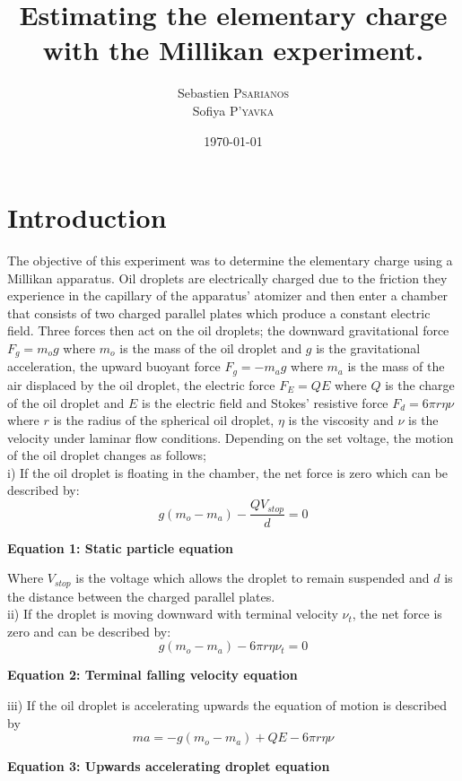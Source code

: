 \documentclass[
	letterpaper, %
	10pt, %
]{CSUniSchoolLabReport}
\title{Estimating the elementary charge with the Millikan experiment.}
\author{Sebastien \textsc{Psarianos}\\ Sofiya \textsc{P'yavka}}
\date{\today}
\begin{document}
\maketitle

\section{Introduction}
The objective of this experiment was to determine the elementary charge using a Millikan apparatus.
Oil droplets are electrically charged due to the friction they experience in the capillary of the
apparatus' atomizer and then enter a chamber that consists of two charged  parallel plates which
produce a constant electric field. Three forces then act on the oil droplets; the downward gravitational
force $F_g = m_og$ where $m_o$ is the mass of the oil droplet and $g$ is the gravitational acceleration,
the upward buoyant force $F_g=-m_ag$ where $m_a$ is the mass of the air displaced by the oil droplet,
the electric force $F_E=QE$ where $Q$ is the charge of the oil droplet and $E$ is the electric field and
Stokes' resistive force $F_d=6\pi r \eta\nu$ where $r$ is the radius of the spherical oil
droplet, $\eta$ is the viscosity and $\nu$ is the velocity under laminar flow conditions.
Depending on the set voltage, the motion of the oil droplet changes as follows;\\

i) If the oil droplet is floating in the chamber, the net force is zero which can be described by:
$$g(m_o-m_a)-\frac{QV_{stop}}{d}=0$$
\begin{center}
    \textbf{Equation 1: Static particle equation}
\end{center}
Where $V_{stop}$ is the voltage which allows the droplet to remain suspended and $d$ is the
distance between the charged parallel plates.\\

ii) If the droplet is moving downward with terminal velocity $\nu_t$, the net force is zero
and can be described by:
$$g(m_o-m_a)-6\pi r \eta\nu_t=0$$
\begin{center}
    \textbf{Equation 2: Terminal falling velocity equation}
\end{center}

iii) If the oil droplet is accelerating upwards the equation of motion is described by
$$ma=-g(m_o-m_a)+QE- 6\pi r \eta\nu$$
\begin{center}
    \textbf{Equation 3: Upwards accelerating droplet equation}
\end{center}
\end{document}
